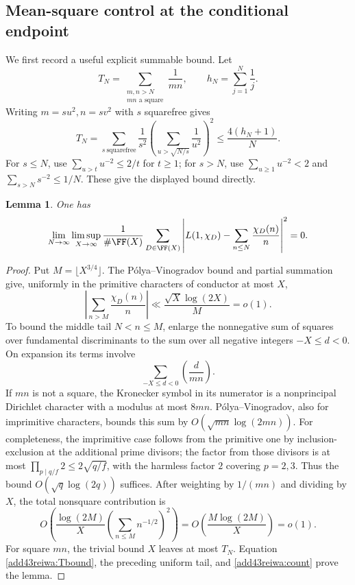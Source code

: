 \documentclass[11pt,a4paper]{article}
\numberwithin{equation}{section}
\newtheorem{lemma}[theorem]{Lemma}
\theoremstyle{definition}
\theoremstyle{remark}
\begin{document}
\subsection{Mean-square control at the conditional endpoint}
We first record a useful explicit summable bound. Let
\[
 T_N=\sum_{\substack{m,n>N\\mn\text{ a square}}}\frac1{mn},
 \qquad h_N=\sum_{j=1}^N\frac1j.
\]
Writing $m=su^2,n=sv^2$ with $s$ squarefree gives
\begin{equation}\label{add43reiwa:Tbound}
 T_N=\sum_{s\ \mathrm{squarefree}}\frac1{s^2}
       \left(\sum_{u>\sqrt{N/s}}\frac1{u^2}\right)^2
       \le\frac{4(h_N+1)}{N}.
\end{equation}
For $s\le N$, use $\sum_{u>t}u^{-2}\le2/t$ for $t\ge1$;
for $s>N$, use $\sum_{u\ge1}u^{-2}<2$ and
$\sum_{s>N}s^{-2}\le1/N$. These give the displayed bound directly.

\begin{lemma}\label{add43reiwa:arithmeticL2}
One has
\[
 \lim_{N\to\infty}\limsup_{X\to\infty}
 \frac1{\#\FF(X)}\sum_{D\in\FF(X)}
 \left|L(1,\chi_D)-\sum_{n\le N}\frac{\chi_D(n)}n\right|^2=0.
\]
\end{lemma}
\begin{proof}
Put $M=\lfloor X^{3/4}\rfloor$. The P\'olya--Vinogradov bound and
partial summation give, uniformly in the primitive characters of
conductor at most $X$,
\[
 \left|\sum_{n>M}\frac{\chi_D(n)}n\right|
       \ll\frac{\sqrt X\log(2X)}{M}=o(1).
\]
To bound the middle tail $N<n\le M$, enlarge the nonnegative sum of
squares over fundamental discriminants to the sum over all negative
integers $-X\le d<0$. On expansion its terms involve
\[
              \sum_{-X\le d<0}\left(\frac{d}{mn}\right).
\]
If $mn$ is not a square, the Kronecker symbol in its numerator is a
nonprincipal Dirichlet character with a modulus at most $8mn$.
P\'olya--Vinogradov, also for imprimitive characters, bounds this
sum by $O(\sqrt{mn}\log(2mn))$. For completeness, the imprimitive
case follows from the primitive one by inclusion-exclusion at the
additional prime divisors; the factor from those divisors is at most
$\prod_{p\mid q/f}2\le2\sqrt{q/f}$, with the harmless factor $2$
covering $p=2,3$. Thus the bound $O(\sqrt q\log(2q))$ suffices.
After weighting by $1/(mn)$ and dividing by $X$, the total nonsquare
contribution is
\[
 O\left(\frac{\log(2M)}X
          \left(\sum_{n\le M}n^{-1/2}\right)^2\right)
       =O\left(\frac{M\log(2M)}X\right)=o(1).
\]
For square $mn$, the trivial bound $X$ leaves at most $T_N$.
Equation \eqref{add43reiwa:Tbound}, the preceding uniform tail, and
\eqref{add43reiwa:count} prove the lemma.
\end{proof}
\end{document}
